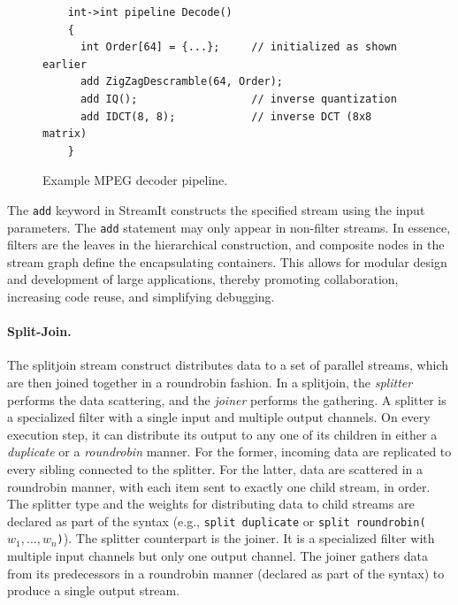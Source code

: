 \begin{figure}[t]
  \begin{scriptsize}
    \begin{verbatim}
	int->int pipeline Decode()
	{ 
	  int Order[64] = {...};     // initialized as shown earlier
	  add ZigZagDescramble(64, Order);
	  add IQ();                  // inverse quantization
	  add IDCT(8, 8);            // inverse DCT (8x8 matrix)
	}
    \end{verbatim}
  \end{scriptsize}
  \caption{Example MPEG decoder pipeline.}
  \label{fig:decoder-pipeline}
\end{figure}

The {\tt add} keyword in StreamIt constructs the specified stream
using the input parameters. The {\tt add} statement may only appear in
non-filter streams.  In essence, filters are the leaves in the
hierarchical construction, and composite nodes in the stream graph
define the encapsulating containers. This allows for modular design
and development of large applications, thereby  promoting
collaboration, increasing code reuse, and simplifying debugging.

\paragraph{Split-Join.}
The splitjoin stream construct distributes data to a set of parallel
streams, which are then joined together in a roundrobin fashion. In a
splitjoin, the {\it splitter} performs the data scattering, and the
{\it joiner} performs the gathering. A splitter is a specialized
filter with a single input and multiple output channels. On  every
execution step, it can distribute its output to any one of its
children in either a {\it duplicate} or a {\it roundrobin} manner. For
the former, incoming data are replicated to every sibling connected to
the splitter. For the latter, data are scattered in a roundrobin
manner, with each item sent to exactly one child stream, in order. The
splitter type and the weights for distributing data to child streams
are declared as part of the syntax (e.g., \texttt{split duplicate} or
\texttt{split roundrobin($w_1,\ldots,w_n$)}). The splitter counterpart
is the joiner. It is a specialized filter with  multiple input
channels but only one output channel. The joiner gathers data from its
predecessors in a roundrobin manner (declared as part of the syntax)
to produce a single output stream.

